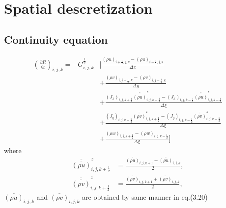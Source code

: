 \section{Spatial descretization}
\subsection{Continuity equation}
\begin{align}
 \left(\frac{\partial R}{\partial t}\right)_{i,j,k}
 = - G^{\frac{1}{2}}_{i,j,k} &\Bigg[ \frac{ (\rho u)_{i+\frac{1}{2},j,k}
                                          - (\rho u)_{i-\frac{1}{2},j,k}
                                          } {\Delta x} \nonumber \\
                                  &+ \frac{ (\rho v)_{i,j+\frac{1}{2},k}
                                          - (\rho v)_{i,j-\frac{1}{2},k}
                                          } {\Delta y} \nonumber \\
                                  &+ \frac{ (J_{x})_{i,j,k+\frac{1}{2}} \overline{\overline{(\rho u)}}^z_{i,j,k+\frac{1}{2}}
                                          - (J_{x})_{i,j,k-\frac{1}{2}} \overline{\overline{(\rho u)}}^z_{i,j,k-\frac{1}{2}}
                                          } {\Delta \xi} \nonumber \\
                                  &+ \frac{ (J_{y})_{i,j,k+\frac{1}{2}} \overline{\overline{(\rho v)}}^z_{i,j,k+\frac{1}{2}}
                                          - (J_{y})_{i,j,k-\frac{1}{2}} \overline{\overline{(\rho v)}}^z_{i,j,k-\frac{1}{2}}
                                          } {\Delta \xi} \nonumber \\
                                  &+ \frac{ (\rho w)_{i,j,k+\frac{1}{2}}
                                          - (\rho w)_{i,j,k-\frac{1}{2}}
                                          } {\Delta \xi} \Bigg]
\end{align}
where
\begin{align}
 \overline{\overline{(\rho u)}}^z_{i,j,k+\frac{1}{2}} &= \frac{ \overline{(\rho u)}_{i,j,k+1}
                                                              + \overline{(\rho u)}_{i,j,k  }
                                                              } {2}, \\
 \overline{\overline{(\rho v)}}^z_{i,j,k+\frac{1}{2}} &= \frac{ \overline{(\rho v)}_{i,j,k+1}
                                                              + \overline{(\rho v)}_{i,j,k  }
                                                              } {2},
\end{align}
$\overline{(\rho u)}_{i,j,k}$ and $\overline{(\rho v)}_{i,j,k}$ are obtained by same manner in eq.(3.20)

